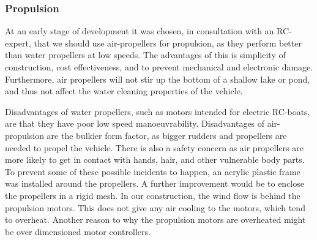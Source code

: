 

\subsubsection{Propulsion}

At an early stage of development it was chosen, in consultation with an RC-expert, that we should use air-propellers for propulsion, as they perform better than water propellers at low speeds. The advantages of this is simplicity of construction, cost effectiveness, and to prevent mechanical and electronic damage. %
Furthermore, air propellers will not stir up the bottom of a shallow lake or pond, and thus not affect the water cleaning properties of the vehicle.

Disadvantages of water propellers, such as motors intended for electric RC-boats, are that they have poor low speed manoeuvrability. Disadvantages of air-propulsion are the bulkier form factor, as bigger rudders and propellers are needed to propel the vehicle. There is also a safety concern as air propellers are more likely to get in contact with hands, hair, and other vulnerable body parts. To prevent some of these possible incidents to happen, an acrylic plastic frame was installed around the propellers. A further improvement would be to enclose the propellers in a rigid mesh.
In our construction, the wind flow is behind the propulsion motors. This does not give any air cooling to the motors, which tend to overheat. Another reason to why the propulsion motors are overheated might be over dimensioned motor controllers.

